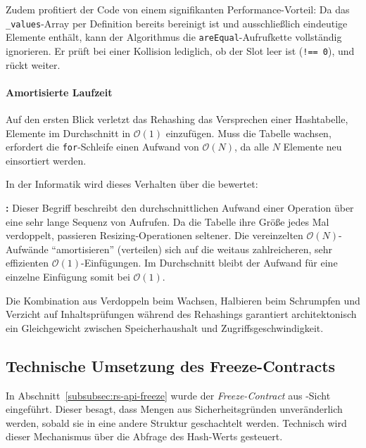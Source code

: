 Zudem profitiert der Code von einem signifikanten Performance-Vorteil: Da das \texttt{_values}-Array per Definition bereits bereinigt ist und ausschließlich eindeutige Elemente enthält, kann der Algorithmus die \texttt{areEqual}-Aufrufkette vollständig ignorieren. Er prüft bei einer Kollision lediglich, ob der Slot leer ist (\texttt{!== 0}), und rückt weiter.

\paragraph*{Amortisierte Laufzeit}
Auf den ersten Blick verletzt das Rehashing das Versprechen einer Hashtabelle, Elemente im Durchschnitt in $\mathcal{O}(1)$ einzufügen. Muss die Tabelle wachsen, erfordert die \texttt{for}-Schleife einen Aufwand von $\mathcal{O}(N)$, da alle $N$ Elemente neu einsortiert werden.

In der Informatik wird dieses Verhalten über die \textit{} bewertet:

\begin{definition}
\label{def:amortisierte-laufzeit}
\textbf{:} Dieser Begriff beschreibt den durchschnittlichen Aufwand einer Operation über eine sehr lange Sequenz von Aufrufen. Da die Tabelle ihre Größe jedes Mal verdoppelt, passieren Resizing-Operationen seltener. Die vereinzelten $\mathcal{O}(N)$-Aufwände \enquote{amortisieren} (verteilen) sich auf die weitaus zahlreicheren, sehr effizienten $\mathcal{O}(1)$-Einfügungen. Im Durchschnitt bleibt der Aufwand für eine einzelne Einfügung somit bei  $\mathcal{O}(1)$.
\end{definition}

Die Kombination aus Verdoppeln beim Wachsen, Halbieren beim Schrumpfen und Verzicht auf Inhalts\-prüfungen während des Rehashings garantiert architektonisch ein Gleichgewicht zwischen Speicherhaushalt und Zugriffsgeschwindigkeit.


\subsection{Technische Umsetzung des Freeze-Contracts}
\label{subsec:rs-intern-freeze}

In Abschnitt~\ref{subsubsec:rs-api-freeze} wurde der \emph{Freeze-Contract} aus -Sicht eingeführt. Dieser besagt, dass Mengen aus Sicherheitsgründen unveränderlich werden, sobald sie in eine andere Struktur geschachtelt werden. Technisch wird dieser Mechanismus über die Abfrage des Hash-Werts gesteuert.

